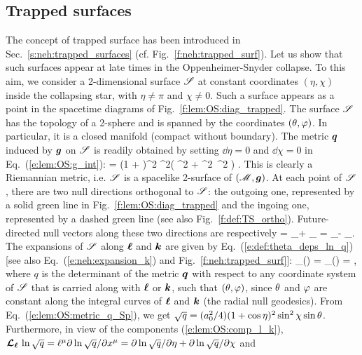 \subsection{Trapped surfaces}

The concept of trapped surface
has been introduced in Sec.~\ref{s:neh:trapped_surfaces}
(cf. Fig.~\ref{f:neh:trapped_surf}).
Let us show that such surfaces appear at late times in the Oppenheimer-Snyder collapse.
To this aim, we consider a 2-dimensional surface $\mathscr{S}$ at constant coordinates $(\eta,\chi)$
inside the collapsing star, with $\eta\neq \pi$ and $\chi\neq 0$.
Such a surface appears as a point in the spacetime diagrams of
Fig.~\ref{f:lem:OS:diag_trapped}. The surface $\mathscr{S}$
has the topology of a 2-sphere and
is spanned by the coordinates $(\theta,\varphi)$. In particular,
it is a closed manifold (compact
without boundary).
The metric $\bm{q}$ induced by $\bm{g}$ on $\mathscr{S}$ is readily
obtained by setting $\dd\eta = 0$ and $\dd\chi = 0$ in Eq.~(\ref{e:lem:OS:g_int}):
\be \label{e:lem:OS:metric_q_Sp}
       =  (1 + \cos\eta)^2
        \sin^2\chi \left( \dd\th^2 + \sin^2\th\, \dd\ph^2 \right)   .
\ee
This is clearly a Riemannian metric, i.e. $\mathscr{S}$ is a spacelike 2-surface
of $(\mathscr{M},\bm{g})$.
At each point of $\mathscr{S}$, there are two null directions orthogonal to $\mathscr{S}$:
the outgoing one, represented by a solid green line in Fig.~\ref{f:lem:OS:diag_trapped}
and the ingoing one, represented by a dashed green line (see also
Fig.~\ref{f:def:TS_ortho}). Future-directed null vectors along these
two directions are respectively
\be \label{e:lem:OS:comp_l_k}
    \wl = \wpar_\eta + \wpar_\chi \qand
     = \wpar_\eta - \wpar_\chi .
\ee
The expansions of $\mathscr{S}$ along $\bm{\ell}$ and $\bm{k}$ are
given by Eq.~(\ref{e:def:theta_deps_ln_q}) [see also Eq.~(\ref{e:neh:expansion_k})
and Fig.~\ref{f:neh:trapped_surf}]:
\be
     \theta_{(\wl)} = \Lie{\el} \ln {}
     \qand
     \theta_{()} =   \ln {} ,
\ee
where $q$ is the determinant of the metric $\bm{q}$ with respect to any
coordinate system of $\mathscr{S}$ that is carried along with $\bm{\ell}$ or $\bm{k}$,
such that $(\theta,\varphi)$, since $\theta$ and $\varphi$ are constant along the integral
curves of $\bm{\ell}$ and $\bm{k}$ (the radial null geodesics). From Eq.~(\ref{e:lem:OS:metric_q_Sp}),
we get $\sqrt{q}= (a_0^2/4)(1 + \cos\eta)^2 \sin^2\chi \sin\theta$.
Furthermore, in view of the components (\ref{e:lem:OS:comp_l_k}),
$\bm{\mathcal{L}}_{\bm{\bm{\ell}}}\, \ln \sqrt{q} = \ell^\mu \partial \ln \sqrt{q} /\partial x^\mu =
 \partial \ln \sqrt{q} /\partial \eta + \partial \ln\sqrt{q} /\partial \chi$
 and
